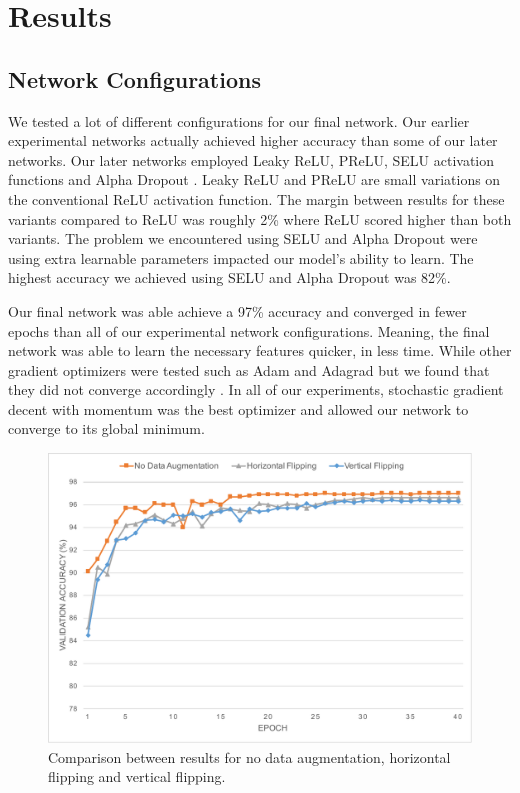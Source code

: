 \documentclass{osa-article}
\begin{document}
\section{Results}
\subsection{Network Configurations}
We tested a lot of different configurations for our final network. Our earlier experimental networks actually achieved higher  accuracy than some of our later networks. Our later networks employed Leaky ReLU, PReLU, SELU activation functions and Alpha Dropout \cite{DBLP:journals/corr/HeZR015, Maas13rectifiernonlinearities, DBLP:journals/corr/KlambauerUMH17}. Leaky ReLU and PReLU are small variations on the conventional ReLU activation function. The margin between results for these variants compared to ReLU was roughly 2\% where ReLU scored higher than both variants. The problem we encountered using SELU and Alpha Dropout were using extra learnable parameters impacted our model's ability to learn. The highest accuracy we achieved using SELU and Alpha Dropout was 82\%.\par
Our final network was able achieve a 97\% accuracy and converged in fewer epochs than all of our experimental network configurations. Meaning, the final network was able to learn the necessary features quicker, in less time. While other gradient optimizers were tested such as Adam and Adagrad but we found that they did not converge accordingly \cite{DBLP:journals/corr/KingmaB14, Duchi:EECS-2010-24}. In all of our experiments, stochastic gradient decent with momentum was the best optimizer and allowed our network to converge to its global minimum.
\begin{figure}[!ht]
\centering
\includegraphics[width=.99\linewidth]{data_augmentation}
\caption{Comparison between results for no data augmentation, horizontal flipping and vertical flipping.}\label{augmentation_graph}
\end{figure}
%
\end{document}
